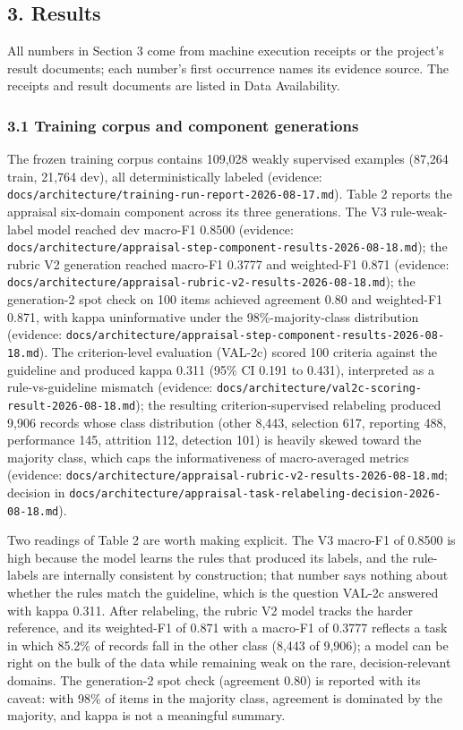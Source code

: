 \documentclass[
]{article}
\begin{document}
\subsection{3. Results}\label{results}

All numbers in Section 3 come from machine execution receipts or the
project's result documents; each number's first occurrence names its
evidence source. The receipts and result documents are listed in Data
Availability.

\subsubsection{3.1 Training corpus and component
generations}\label{training-corpus-and-component-generations}

The frozen training corpus contains 109,028 weakly supervised examples
(87,264 train, 21,764 dev), all deterministically labeled (evidence:
\texttt{docs/architecture/training-run-report-2026-08-17.md}). Table 2
reports the appraisal six-domain component across its three generations.
The V3 rule-weak-label model reached dev macro-F1 0.8500 (evidence:
\texttt{docs/architecture/appraisal-step-component-results-2026-08-18.md});
the rubric V2 generation reached macro-F1 0.3777 and weighted-F1 0.871
(evidence:
\texttt{docs/architecture/appraisal-rubric-v2-results-2026-08-18.md});
the generation-2 spot check on 100 items achieved agreement 0.80 and
weighted-F1 0.871, with kappa uninformative under the
98\%-majority-class distribution (evidence:
\texttt{docs/architecture/appraisal-step-component-results-2026-08-18.md}).
The criterion-level evaluation (VAL-2c) scored 100 criteria against the
guideline and produced kappa 0.311 (95\% CI 0.191 to 0.431), interpreted
as a rule-vs-guideline mismatch (evidence:
\texttt{docs/architecture/val2c-scoring-result-2026-08-18.md}); the
resulting criterion-supervised relabeling produced 9,906 records whose
class distribution (other 8,443, selection 617, reporting 488,
performance 145, attrition 112, detection 101) is heavily skewed toward
the majority class, which caps the informativeness of macro-averaged
metrics (evidence:
\texttt{docs/architecture/appraisal-rubric-v2-results-2026-08-18.md};
decision in
\texttt{docs/architecture/appraisal-task-relabeling-decision-2026-08-18.md}).

Two readings of Table 2 are worth making explicit. The V3 macro-F1 of
0.8500 is high because the model learns the rules that produced its
labels, and the rule-labels are internally consistent by construction;
that number says nothing about whether the rules match the guideline,
which is the question VAL-2c answered with kappa 0.311. After
relabeling, the rubric V2 model tracks the harder reference, and its
weighted-F1 of 0.871 with a macro-F1 of 0.3777 reflects a task in which
85.2\% of records fall in the other class (8,443 of 9,906); a model can
be right on the bulk of the data while remaining weak on the rare,
decision-relevant domains. The generation-2 spot check (agreement 0.80)
is reported with its caveat: with 98\% of items in the majority class,
agreement is dominated by the majority, and kappa is not a meaningful
summary.
\end{document}
